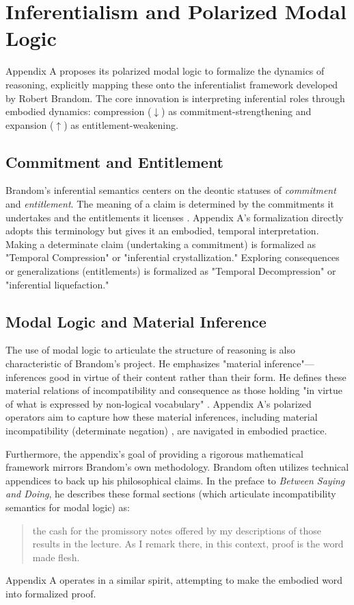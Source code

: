 \documentclass[12pt]{book}
\begin{document}
\section{Inferentialism and Polarized Modal Logic}

Appendix A proposes its polarized modal logic to formalize the dynamics of reasoning, explicitly mapping these onto the inferentialist framework developed by Robert Brandom. The core innovation is interpreting inferential roles through embodied dynamics: compression ($\downarrow$) as commitment-strengthening and expansion ($\uparrow$) as entitlement-weakening.

\subsection{Commitment and Entitlement}

Brandom's inferential semantics centers on the deontic statuses of \textit{commitment} and \textit{entitlement}. The meaning of a claim is determined by the commitments it undertakes and the entitlements it licenses \parencite{brandom1994making, Brandom2000}. Appendix A's formalization directly adopts this terminology but gives it an embodied, temporal interpretation. Making a determinate claim (undertaking a commitment) is formalized as "Temporal Compression" or "inferential crystallization." Exploring consequences or generalizations (entitlements) is formalized as "Temporal Decompression" or "inferential liquefaction."

\subsection{Modal Logic and Material Inference}

The use of modal logic to articulate the structure of reasoning is also characteristic of Brandom's project. He emphasizes "material inference"—inferences good in virtue of their content rather than their form. He defines these material relations of incompatibility and consequence as those holding "in virtue of what is expressed by non-logical vocabulary" \parencite[Note 9]{brandom_reason_2013}. Appendix A's polarized operators aim to capture how these material inferences, including material incompatibility (determinate negation) \parencite{Brandom:2019aa}, are navigated in embodied practice.

Furthermore, the appendix's goal of providing a rigorous mathematical framework mirrors Brandom's own methodology. Brandom often utilizes technical appendices to back up his philosophical claims. In the preface to \textit{Between Saying and Doing}, he describes these formal sections (which articulate incompatibility semantics for modal logic) as:
\begin{quote}
the cash for the promissory notes offered by my descriptions of those results in the lecture. As I remark there, in this context, proof is the word made flesh. \parencite[p. xix]{Brandom2008}
\end{quote}
Appendix A operates in a similar spirit, attempting to make the embodied word into formalized proof.
\end{document}
